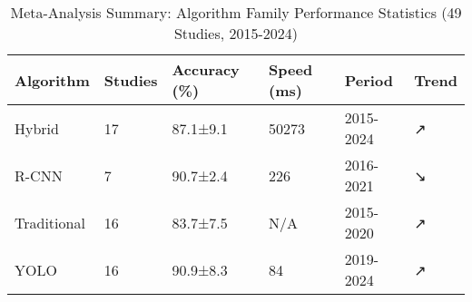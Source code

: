 
\begin{table}[htbp]
\centering
\small
\caption{Meta-Analysis Summary: Algorithm Family Performance Statistics (49 Studies, 2015-2024)}
\label{tab:meta_analysis_summary}
\renewcommand{\arraystretch}{1.3}
\begin{tabular}{p{2cm}p{1.5cm}p{2cm}p{2cm}p{1.5cm}p{2cm}}
\toprule
\textbf{Algorithm} & \textbf{Studies} & \textbf{Accuracy (\%)} & \textbf{Speed (ms)} & \textbf{Period} & \textbf{Trend} \\
\midrule
Hybrid & 17 & 87.1±9.1 & 50273 & 2015-2024 & ↗ \\
R-CNN & 7 & 90.7±2.4 & 226 & 2016-2021 & ↘ \\
Traditional & 16 & 83.7±7.5 & N/A & 2015-2020 & ↗ \\
YOLO & 16 & 90.9±8.3 & 84 & 2019-2024 & ↗ \\
\bottomrule
\end{tabular}
\end{table}
